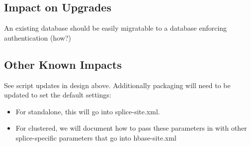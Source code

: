 \documentclass{article}
\begin{document}
\subsection{Impact on Upgrades}

An existing database should be easily migratable to a database enforcing authentication (how?)

\subsection{Other Known Impacts}

See script updates in design above.  Additionally packaging will need to be updated to set the default settings:
\begin{itemize}
\item For standalone, this will go into splice-site.xml.
\item For clustered, we will document how to pass these parameters in with other splice-specific parameters that go into hbase-site.xml
\end{itemize}
 
\end{document}
